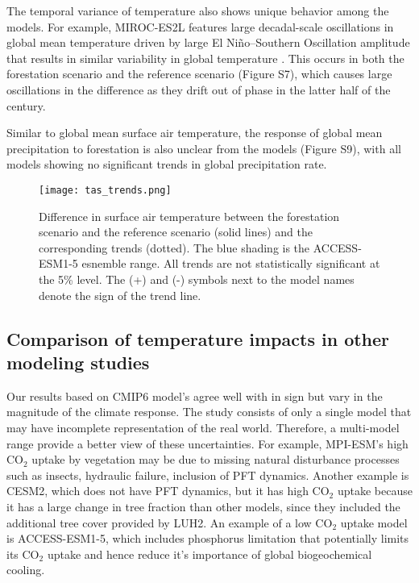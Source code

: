 \documentclass[draft]{agujournal2019}
\begin{document}
The temporal variance of temperature also shows unique behavior among the models.
For example, MIROC-ES2L features large decadal-scale oscillations in global mean temperature driven by large El Niño–Southern Oscillation amplitude that results in similar variability in global temperature \cite{hajima_development_2020}.
This occurs in both the forestation scenario and the reference scenario (Figure S7), which causes large oscillations in the difference as they drift out of phase in the latter half of the century.

Similar to global mean surface air temperature, the response of global mean precipitation to forestation is also unclear from the models (Figure S9), with all models showing no significant trends in global precipitation rate.

\begin{figure}
    \texttt{[image: tas\_trends.png]}
    \caption{Difference in surface air temperature between the forestation scenario and the reference scenario (solid lines) and the corresponding trends (dotted). The blue shading is the ACCESS-ESM1-5 esnemble range. All trends are not statistically significant at the 5\% level. The (+) and (-) symbols next to the model names denote the sign of the trend line.}
    \label{fig:models_tas_trends}
\end{figure}

\subsection{Comparison of temperature impacts in other modeling studies}

Our results based on CMIP6 model's agree well with \cite{sonntag_quantifying_2018} in sign but vary in the magnitude of the climate response.
The  study consists of only a single model that may have incomplete representation of the real world.
Therefore, a multi-model range provide a better view of these uncertainties.
For example, MPI-ESM's high CO$_2$ uptake by vegetation may be due to missing natural disturbance processes such as insects, hydraulic failure, inclusion of PFT dynamics.
Another example is CESM2, which does not have PFT dynamics, but it has high CO$_2$ uptake because it has a large change in tree fraction than other models, since they included the additional tree cover provided by LUH2.
An example of a low CO$_2$ uptake model is ACCESS-ESM1-5, which includes phosphorus limitation that potentially limits its CO$_2$ uptake and hence reduce it's importance of global biogeochemical cooling.
\end{document}

